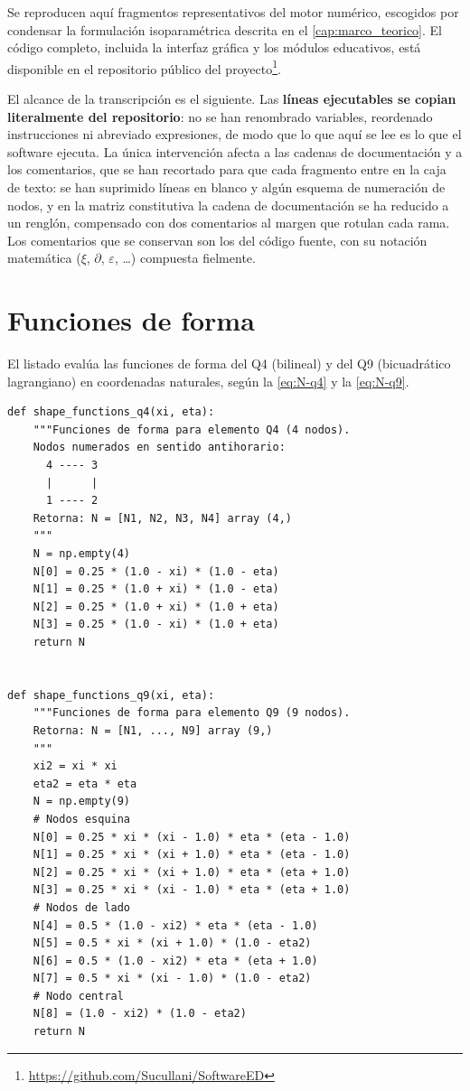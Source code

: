 Se reproducen aquí fragmentos representativos del motor numérico, escogidos por condensar la formulación isoparamétrica descrita en el \autoref{cap:marco_teorico}. El código completo, incluida la interfaz gráfica y los módulos educativos, está disponible en el repositorio público del proyecto\footnote{\url{https://github.com/Sucullani/SoftwareED}}.

El alcance de la transcripción es el siguiente. Las \textbf{líneas ejecutables se copian literalmente del repositorio}: no se han renombrado variables, reordenado instrucciones ni abreviado expresiones, de modo que lo que aquí se lee es lo que el software ejecuta. La única intervención afecta a las cadenas de documentación y a los comentarios, que se han recortado para que cada fragmento entre en la caja de texto: se han suprimido líneas en blanco y algún esquema de numeración de nodos, y en la matriz constitutiva la cadena de documentación se ha reducido a un renglón, compensado con dos comentarios al margen que rotulan cada rama. Los comentarios que se conservan son los del código fuente, con su notación matemática ($\xi$, $\partial$, $\varepsilon$, \dots) compuesta fielmente.

\section{Funciones de forma}

El listado evalúa las funciones de forma del Q4 (bilineal) y del Q9 (bicuadrático lagrangiano) en coordenadas naturales, según la \autoref{eq:N-q4} y la \autoref{eq:N-q9}.

\begin{lstlisting}
def shape_functions_q4(xi, eta):
    """Funciones de forma para elemento Q4 (4 nodos).
    Nodos numerados en sentido antihorario:
      4 ---- 3
      |      |
      1 ---- 2
    Retorna: N = [N1, N2, N3, N4] array (4,)
    """
    N = np.empty(4)
    N[0] = 0.25 * (1.0 - xi) * (1.0 - eta)
    N[1] = 0.25 * (1.0 + xi) * (1.0 - eta)
    N[2] = 0.25 * (1.0 + xi) * (1.0 + eta)
    N[3] = 0.25 * (1.0 - xi) * (1.0 + eta)
    return N


def shape_functions_q9(xi, eta):
    """Funciones de forma para elemento Q9 (9 nodos).
    Retorna: N = [N1, ..., N9] array (9,)
    """
    xi2 = xi * xi
    eta2 = eta * eta
    N = np.empty(9)
    # Nodos esquina
    N[0] = 0.25 * xi * (xi - 1.0) * eta * (eta - 1.0)
    N[1] = 0.25 * xi * (xi + 1.0) * eta * (eta - 1.0)
    N[2] = 0.25 * xi * (xi + 1.0) * eta * (eta + 1.0)
    N[3] = 0.25 * xi * (xi - 1.0) * eta * (eta + 1.0)
    # Nodos de lado
    N[4] = 0.5 * (1.0 - xi2) * eta * (eta - 1.0)
    N[5] = 0.5 * xi * (xi + 1.0) * (1.0 - eta2)
    N[6] = 0.5 * (1.0 - xi2) * eta * (eta + 1.0)
    N[7] = 0.5 * xi * (xi - 1.0) * (1.0 - eta2)
    # Nodo central
    N[8] = (1.0 - xi2) * (1.0 - eta2)
    return N
\end{lstlisting}

